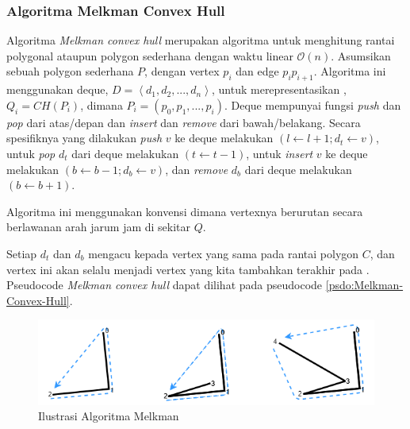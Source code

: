 \subsubsection{Algoritma Melkman Convex Hull}
\label{sec:algoritma-melkman-convex-hull}
Algoritma \textit{Melkman convex hull} merupakan algoritma untuk menghitung rantai polygonal ataupun polygon sederhana dengan waktu linear $\mathcal{O}(n)$\cite{melkman_algorithm}. Asumsikan sebuah polygon sederhana $P$, dengan vertex $p_i$ dan edge $p_i p_{i+1}$. Algoritma ini menggunakan deque, $D = \left \langle d_1, d_2, ..., d_n \right \rangle$, untuk merepresentasikan \CH, $Q_i = CH(P_i)$, dimana $P_i = (p_0, p_1, ..., p_i)$. Deque mempunyai fungsi \textit{push} dan \textit{pop} dari atas/depan dan \textit{insert} dan \textit{remove} dari bawah/belakang. Secara spesifiknya yang dilakukan \textit{push} $v$ ke deque melakukan $(l \leftarrow l+1; d_t \leftarrow v)$, untuk \textit{pop} $d_t$ dari deque melakukan $(t \leftarrow t-1)$, untuk \textit{insert} $v$ ke deque melakukan $(b \leftarrow b-1; d_b \leftarrow v)$, dan \textit{remove} $d_b$ dari deque melakukan $(b \leftarrow b+1)$.
\par Algoritma ini menggunakan konvensi dimana vertexnya berurutan secara berlawanan arah jarum jam di sekitar \CH $Q$.
\par Setiap $d_t$ dan $d_b$ mengacu kepada vertex yang sama pada rantai polygon $C$, dan vertex ini akan selalu menjadi vertex yang kita tambahkan terakhir pada \CH. Pseudocode \textit{Melkman convex hull} dapat dilihat pada pseudocode \ref{psdo:Melkman-Convex-Hull}.
\begin{figure}[!h]
	\Centering
	\includegraphics [width=\columnwidth]{bab2/img/ilustrasi-algoritma-melkman}
	\caption {Ilustrasi Algoritma Melkman}
	\label {fig:ilustrasi-algoritma-melkman}
\end{figure}
